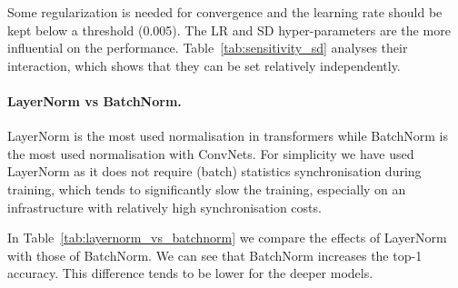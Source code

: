 Some regularization is needed for convergence and the learning rate should be kept below a threshold (0.005). 
The LR and SD hyper-parameters are the more influential on the performance. Table~\ref{tab:sensitivity_sd} analyses their interaction, which shows that they can be set relatively independently.  

\begin{table}[h]
\centering
{}
\caption{Analysis of Learning rate vs stochastic depth hyper-parameters  (S60, WD=0.01). 
\label{tab:sensitivity_sd}} 
\end{table}



\paragraph{LayerNorm vs BatchNorm.}
LayerNorm is the most used normalisation in transformers while BatchNorm is the most used normalisation with ConvNets.
For simplicity we have used LayerNorm as it does not require (batch) statistics synchronisation during training, which tends to significantly slow the training, especially on an infrastructure with relatively high synchronisation costs.

In Table~\ref{tab:layernorm_vs_batchnorm}
we compare the effects of LayerNorm with those of  BatchNorm. 
We can see that BatchNorm increases the \ournet top-1 accuracy. This difference tends to be lower for the deeper models.
%

